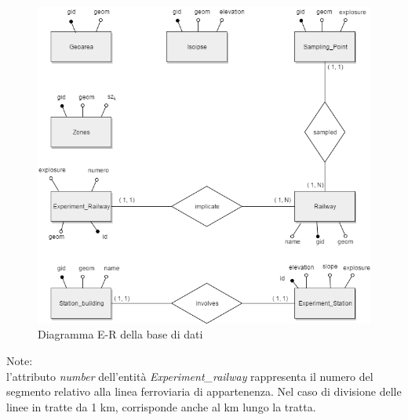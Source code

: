 \begin{figure}[h]
	\centering
	\includegraphics[width=1\textwidth]{img/er}
	\caption{Diagramma E-R della base di dati}
    \label{fig:er}
\end{figure}

Note:\\
l'attributo \textit{number} dell'entità \textit{Experiment\_railway}  rappresenta il numero del segmento relativo alla linea ferroviaria di appartenenza. Nel caso di divisione delle linee in tratte da 1 km,  corrisponde anche al km lungo la tratta.
\pagebreak

